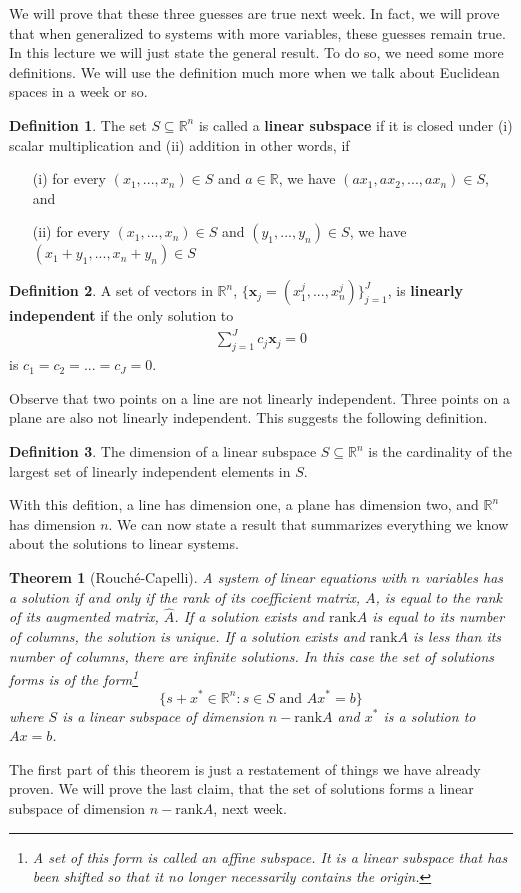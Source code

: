 \documentclass[12pt,reqno]{amsart}
\newcommand{\rank}{\mathrm{rank}}
\newtheorem{theorem}{Theorem}[section]
\theoremstyle{definition}
\newtheorem{definition}{Definition}[section]
\begin{document}
We will prove that these three guesses are true next week. In fact, we
will prove that when generalized to systems with more variables, these
guesses remain true. In this lecture we will just state the general
result. To do so, we need some more definitions. We will use the
definition much more when we talk about Euclidean spaces in a week or
so.
\begin{definition}
  The set $S \subseteq \mathbb{R}^n$ is called a \textbf{linear
    subspace} if it is closed under (i) scalar multiplication and (ii)
  addition in other words, if 
  \begin{itemize}
  \item[(i)] for every $(x_1, ..., x_n)\in S$ and $a \in \mathbb{R}$,
    we have $(a x_1, a x_2, ..., a x_n) \in S$, and
  \item[(ii)] for every $(x_1, ..., x_n)\in S$ and $(y_1, ..., y_n)\in
    S$, we have
    $(x_1 + y_1, ..., x_n + y_n)  \in S$
  \end{itemize}
\end{definition}
\begin{definition}
  A set of vectors in $\mathbb{R}^n$, $\{\textbf{x}_j = (x^j_1,...,
  x^j_n)\}_{j=1}^J$, is \textbf{linearly independent} if the only
  solution to 
  \begin{align*}
    \sum_{j=1}^J c_j \textbf{x}_j = 0 
  \end{align*}
  is $c_1 = c_2 = ... = c_J = 0$. 
\end{definition}
Observe that two points on a line are not linearly independent. Three
points on a plane are also not linearly independent. This suggests the
following definition.
\begin{definition}
  The dimension of a linear subspace $S \subseteq \mathbb{R}^n$ is the
  cardinality of the largest set of linearly independent elements in
  $S$. 
\end{definition} 
With this defition, a line has dimension one, a plane has dimension
two, and $\mathbb{R}^n$ has dimension $n$. We can now state a result
that summarizes everything we know about the solutions to linear
systems. 
\begin{theorem}[Rouch\'{e}-Capelli] \label{thm:rc} A system of linear
  equations with $n$ variables has a solution if and only if the rank
  of its coefficient matrix, $A$, is equal to the rank of its
  augmented matrix, $\hat{A}$. If a solution exists and $\rank A$ is
  equal to its number of columns, the solution is unique. If a
  solution exists and $\rank A$ is less than its number of columns,
  there are infinite solutions. In this case the set of solutions
  forms is of the form\footnote{A set of this form is called an affine
    subspace. It is a linear subspace that has been shifted so that it
    no longer necessarily contains the origin.}
  \[ 
  \{s+x^* \in \mathbb{R}^n : s \in S \text{ and } Ax^* = b \} 
  \]
  where $S$ is a linear subspace of dimension $n - \rank A$ and $x^*$
  is a solution to $A x = b$.
\end{theorem}
The first part of this theorem is just a restatement of things we have
already proven. We will prove the last claim, that the set of solutions
forms a linear subspace of dimension $n - \rank A$, next week.
\end{document}
